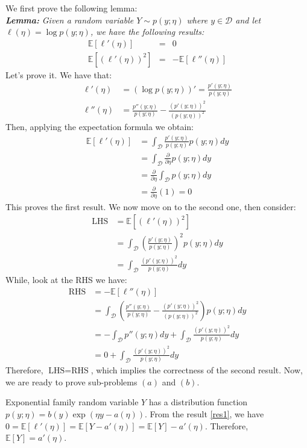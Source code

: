 \begin{answer}
We first prove the following lemma: \\
\textbf{\textit{Lemma:}} \textit{Given a random variable $Y \sim p(y; \eta)$ where $y \in \mathcal{D}$ and let $\ell(\eta) = \log p(y; \eta)$, we have the following results:}
\begin{eqnarray}
	\mathbb{E}[\ell'(\eta)] &=& 0 \label{res1}\\
	\mathbb{E}[(\ell'(\eta))^2] &=& - \mathbb{E}[\ell''(\eta)] \label{res2}
\end{eqnarray}
Let's prove it. We have that:
\begin{align} 
	\ell'(\eta) &= (\log p(y; \eta))' = \frac{p'(y; \eta)}{p(y; \eta)} \\
	\ell''(\eta) &= \frac{p''(y; \eta)}{p(y; \eta)} - \frac{(p'(y; \eta))^2}{(p(y; \eta))^2}
\end{align}
Then, applying the expectation formula we obtain:
\begin{align}
	\mathbb{E}[\ell'(\eta)] &= \int_\mathcal{D} \frac{p'(y; \eta)}{p(y; \eta)} p(y; \eta)dy \\
	&= \int_\mathcal{D} \frac{\partial}{\partial \eta} p(y; \eta) dy \\
	&= \frac{\partial}{\partial \eta} \int_\mathcal{D} p(y; \eta) dy \\
	&= \frac{\partial}{\partial \eta} (1) = 0
\end{align}
This proves the first result. We now move on to the second one, then consider:
\begin{align}
	\text{LHS} &= \mathbb{E}[(\ell'(\eta))^2] \\
	&= \int_\mathcal{D} \left( \frac{p'(y; \eta)}{p(y; \eta)} \right)^2 p(y; \eta) dy \\
	&= \int_\mathcal{D} \frac{(p'(y; \eta))^2}{p(y; \eta)} dy
\end{align}
While, look at the RHS we have:
\begin{align}
	\text{RHS} &= - \mathbb{E}[\ell''(\eta)] \\
	&= \int_\mathcal{D} \left( \frac{p''(y; \eta)}{p(y; \eta)} - \frac{(p'(y; \eta))^2}{(p(y; \eta))^2} \right) p(y; \eta) dy \\
	&= - \int_\mathcal{D} p''(y; \eta) dy +  \int_\mathcal{D} \frac{(p'(y; \eta))^2}{p(y; \eta)} dy \\
	&= 0 + \int_\mathcal{D} \frac{(p'(y; \eta))^2}{p(y; \eta)} dy
\end{align}
Therefore, $\text{LHS} = \text{RHS}$, which implies the correctness of the second result. Now, we are ready to prove sub-problems $(a)$ and $(b)$.

Exponential family random variable $Y$ has a distribution function $p(y; \eta) = b(y) \exp(\eta y - a(\eta))$.
From the result \eqref{res1}, we have $0 = \mathbb{E}[\ell'(\eta)] = \mathbb{E}[Y - a'(\eta)] = \mathbb{E}[Y] - a'(\eta)$. Therefore, $\mathbb{E}[Y] = a'(\eta)$. \\
\end{answer}
